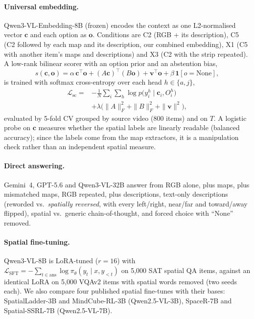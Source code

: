 \paragraph{Universal embedding.}
Qwen3-VL-Embedding-8B (frozen) encodes the context as one L2-normalised vector $\mathbf c$ and each option as $\mathbf o$. Conditions are C2 (RGB + its description), C5 (C2 followed by each map and its description, our combined embedding), X1 (C5 with another item's maps and descriptions) and X3 (C2 with the strip repeated). A low-rank bilinear scorer with an option prior and an abstention bias,
\begin{equation}
s(\mathbf c,\mathbf o)=\alpha\,\mathbf c^{\top}\mathbf o+(A\mathbf c)^{\top}(B\mathbf o)+\mathbf v^{\top}\mathbf o+\beta\,\mathbf{1}[o=\text{None}],
\end{equation}
is trained with softmax cross-entropy over each head $h\in\{a,j\}$,
\begin{equation}
\begin{split}
\mathcal L_{\mathrm{sc}}={}&-\tfrac1N\textstyle\sum_{i}\sum_{h}\log p\big(y^{h}_i\mid\mathbf c_i,O^{h}_i\big)\\
&+\lambda\big(\|A\|_F^2+\|B\|_F^2+\|\mathbf v\|^2\big),
\end{split}
\end{equation}
evaluated by 5-fold CV grouped by source video (800 items) and on $T$. A logistic probe on $\mathbf c$ measures whether the spatial labels are linearly readable (balanced accuracy); since the labels come from the map extractors, it is a manipulation check rather than an independent spatial measure.

\paragraph{Direct answering.}
Gemini~4, GPT-5.6 and Qwen3-VL-32B answer from RGB alone, plus maps, plus mismatched maps, RGB repeated, plus descriptions, text-only descriptions (reworded vs.\ \emph{spatially reversed}, with every left/right, near/far and toward/away flipped), spatial vs.\ generic chain-of-thought, and forced choice with ``None'' removed.

\paragraph{Spatial fine-tuning.}
Qwen3-VL-8B is LoRA-tuned ($r{=}16$) with $\mathcal L_{\mathrm{SFT}}=-\sum_{t\in\text{ans}}\log\pi_\theta(y_t\mid x,y_{<t})$ on 5,000 SAT spatial QA items, against an identical LoRA on 5,000 VQAv2 items with spatial words removed (two seeds each). We also compare four published spatial fine-tunes with their bases: SpatialLadder-3B and MindCube-RL-3B (Qwen2.5-VL-3B), SpaceR-7B and Spatial-SSRL-7B (Qwen2.5-VL-7B).

